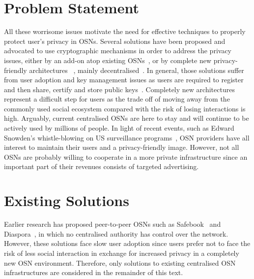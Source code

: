 \section{Problem Statement}
\label{sec:problem_statement}
All these worrisome issues motivate the need for effective techniques to properly protect user's privacy in OSNs. Several solutions have been proposed and advocated to use cryptographic mechanisms in order to address the privacy issues, either by an add-on atop existing OSNs~\cite{art:BadenBSBS09,art:BeatoKW11,art:GuhaSTF08,art:LuoXH09}, or by complete new privacy-friendly architectures~ \cite{art:CristofaroSTW11}, mainly decentralised~\cite{art:CutilloMO11,NYT2010.Diaspora}. In general, those solutions suffer from user adoption and key management issues as users are required to register and then share, certify and store public keys~\cite{art:BalseBADG14}. Completely new architectures represent a difficult step for users as the trade off of moving away from the commonly used social ecosystem compared with the risk of losing interactions is high. Arguably, current centralised OSNs are here to stay and will continue to be actively used by millions of people. In light of recent events, such as Edward Snowden's whistle-blowing on US surveillance programs~\cite{prism}, OSN providers have all interest to maintain their users and a privacy-friendly image. However, not all OSNs are probably willing to cooperate in a more private infrastructure since an important part of their revenues consists of targeted advertising.


\section{Existing Solutions}
\label{sec:existing_solutions}
Earlier research has proposed peer-to-peer OSNs such as Safebook~\cite{art:CutilloMO11} and Diaspora~\cite{NYT2010.Diaspora}, in which no centralised authority has control over the network. However, these solutions face slow user adoption since users prefer not to face the risk of less social interaction in exchange for increased privacy in a completely new OSN environment. Therefore, only solutions to existing centralised OSN infrastructures are considered in the remainder of this text.

